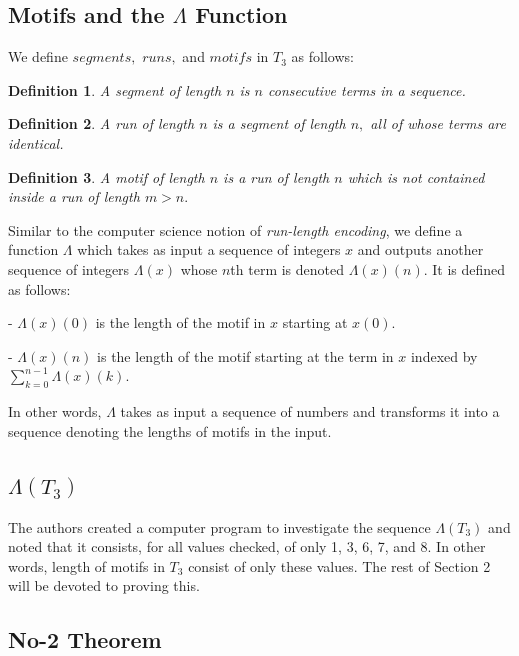 \documentclass{article}
\newtheorem{definition}{Definition}[section]
\begin{document}
\subsection{Motifs and the $\Lambda$ Function}
We define $segments,$ $runs,$ and $motifs$ in $T_3$ as follows:

\begin{definition}
\label{segment}
A \emph{segment} of length $n$ is $n$ consecutive terms in a sequence.
\end{definition}

\begin{definition}
\label{run}
A \emph{run} of length $n$ is a segment of length $n,$ all of whose terms are identical.
\end{definition}

\begin{definition}
\label{motif}
A \emph{motif} of length $n$ is a run of length $n$ which is not contained inside a run of length $m > n.$
\end{definition}

Similar to the computer science notion of \emph{run-length encoding}, we define a function $\Lambda$ which takes as input a sequence of integers $x$ and outputs another sequence of integers $\Lambda(x)$ whose $n$th term is denoted $\Lambda(x)(n).$ It is defined as follows:

- $\Lambda(x)(0)$ is the length of the motif in $x$ starting at $x(0).$

- $\Lambda(x)(n)$ is the length of the motif starting at the term in $x$ indexed by $\sum_{k=0}^{n-1} \Lambda(x)(k).$

In other words, $\Lambda$ takes as input a sequence of numbers and transforms it into a sequence denoting the lengths of motifs in the input.

\subsection{$\Lambda(T_3)$}

The authors created a computer program to investigate the sequence $\Lambda(T_3)$ and noted that it consists, for all values checked, of only 1, 3, 6, 7, and 8. In other words, length of motifs in $T_3$ consist of only these values. The rest of Section 2 will be devoted to proving this.

\subsection{No-2 Theorem}
\end{document}
